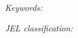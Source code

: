 \documentclass[11pt]{article}
\title{\papertitle}
\author{\paperauthors\\\paperaffiliations}
\date{\paperdate}
\begin{document}
\maketitle

\begin{abstract}
  
\end{abstract}

\noindent\textit{Keywords:} \paperkeywords

\medskip

\noindent\textit{JEL classification:} \paperjel






\appendix

\end{document}
